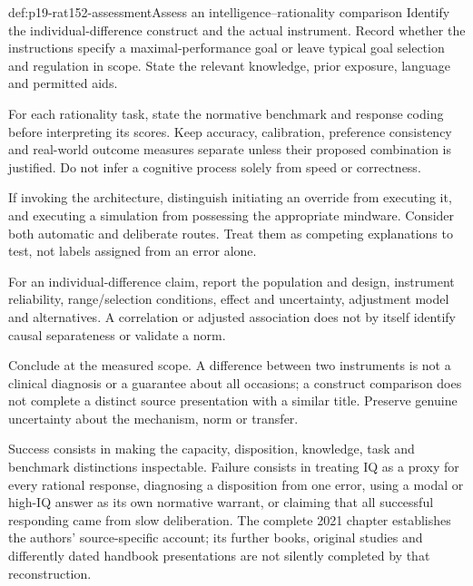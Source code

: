 \begin{hbmethod}{def:p19-rat152-assessment}{Assess an intelligence--rationality comparison}
Identify the individual-difference construct and the actual instrument.
Record whether the instructions specify a maximal-performance goal or
leave typical goal selection and regulation in scope. State the relevant
knowledge, prior exposure, language and permitted aids.

For each rationality task, state the normative benchmark and response
coding before interpreting its scores. Keep accuracy, calibration,
preference consistency and real-world outcome measures separate unless
their proposed combination is justified. Do not infer a cognitive process
solely from speed or correctness.

If invoking the architecture, distinguish initiating an override from
executing it, and executing a simulation from possessing the appropriate
mindware. Consider both automatic and deliberate routes. Treat them as
competing explanations to test, not labels assigned from an error alone.

For an individual-difference claim, report the population and design,
instrument reliability, range/selection conditions, effect and uncertainty,
adjustment model and alternatives. A correlation or adjusted association
does not by itself identify causal separateness or validate a norm.

Conclude at the measured scope. A difference between two instruments is
not a clinical diagnosis or a guarantee about all occasions; a construct
comparison does not complete a distinct source presentation with a similar
title. Preserve genuine uncertainty about the mechanism, norm or transfer.
\end{hbmethod}

Success consists in making the capacity, disposition, knowledge, task and
benchmark distinctions inspectable. Failure consists in treating IQ as a
proxy for every rational response, diagnosing a disposition from one error,
using a modal or high-IQ answer as its own normative warrant, or claiming
that all successful responding came from slow deliberation. The complete
2021 chapter establishes the authors' source-specific account; its further
books, original studies and differently dated handbook presentations are
not silently completed by that reconstruction.
